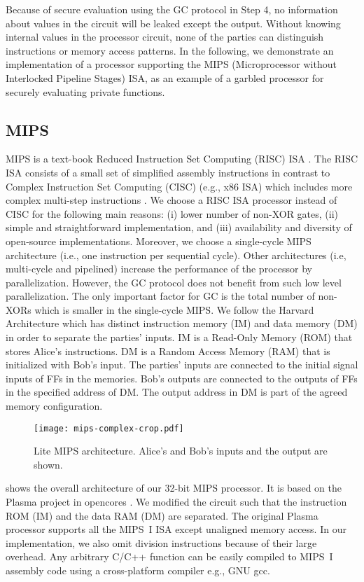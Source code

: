 Because of secure evaluation using the GC protocol in Step 4, no information about values in the circuit will be leaked except the output.
Without knowing internal values in the processor circuit, none of the parties can distinguish instructions or memory access patterns.
In the following, we demonstrate an implementation of a processor supporting the MIPS (Microprocessor without Interlocked Pipeline Stages) ISA, as an example of a garbled processor for securely evaluating private functions.

\subsection{MIPS}
MIPS is a text-book Reduced Instruction Set Computing (RISC) ISA \cite{kane1992mips}.
The RISC ISA consists of a small set of simplified assembly instructions in contrast to Complex Instruction Set Computing (CISC) (e.g., x86 ISA) which includes more complex multi-step instructions \cite{hennessy2012computer}.
We choose a RISC ISA processor instead of CISC for the following main reasons: (i) lower number of non-XOR gates, (ii) simple and straightforward implementation, and (iii) availability and diversity of open-source implementations.
Moreover, we choose a single-cycle MIPS architecture (i.e., one instruction per sequential cycle).
Other architectures (i.e, multi-cycle and pipelined) increase the performance of the processor by parallelization.
However, the GC protocol does not benefit from such low level parallelization.
The only important factor for GC is the total number of non-XORs which is smaller in the single-cycle MIPS.
We follow the Harvard Architecture which has distinct instruction memory (IM) and data memory (DM) in order to separate the parties' inputs.
IM is a Read-Only Memory (ROM) that stores Alice's instructions.
DM is a Random Access Memory (RAM) that is initialized with Bob's input.
The parties' inputs are connected to the initial signal inputs of FFs in the memories.
Bob's outputs are connected to the outputs of FFs in the specified address of DM.
The output address in DM is part of the agreed memory configuration.

\begin{figure}[ht]
\centering
\texttt{[image: mips-complex-crop.pdf]}
\caption{Lite MIPS architecture.
  Alice's and Bob's inputs and the output are shown.}\label{figure:mips}
\end{figure}

 shows the overall architecture of our 32-bit MIPS processor.
It is based on the Plasma project in opencores \cite{rhoads2006plasma}.
We modified the circuit such that the instruction ROM (IM) and the data RAM (DM) are separated.
The original Plasma processor supports all the MIPS~I ISA except unaligned memory access.
In our implementation, we also omit division instructions because of their large overhead.
Any arbitrary C/C++ function can be easily compiled to MIPS~I assembly code using a cross-platform compiler e.g., GNU gcc.

